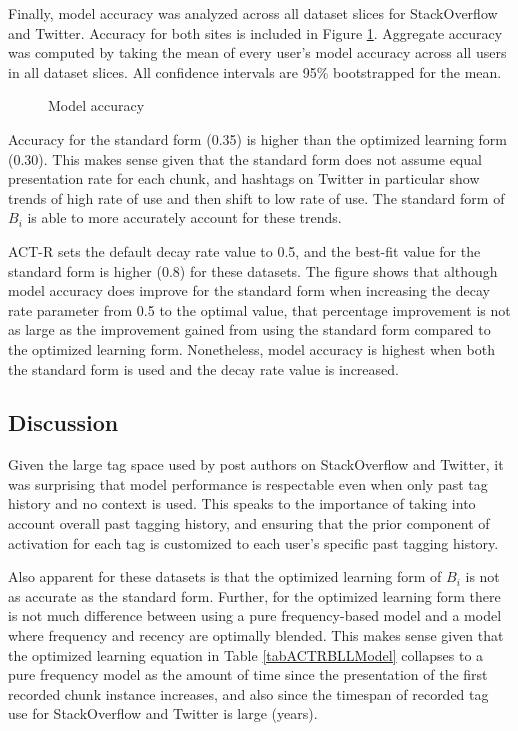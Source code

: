 \documentclass[man,floatsintext,donotrepeattitle]{apa6}
\begin{document}
Finally, model accuracy was analyzed across all dataset slices for StackOverflow and Twitter.
Accuracy for both sites is included in Figure \ref{figPriorAcc}. 
Aggregate accuracy was computed by taking the mean of every user's model accuracy across all users in all dataset slices.
All confidence intervals are 95\% bootstrapped for the mean. 

\begin{figure}[!htbp]
  \caption{Model accuracy}
  \label{figPriorAcc}
\end{figure}

Accuracy for the standard form (\num{0.35}) is higher than the optimized learning form (\num{0.30}).
This makes sense given that the standard form does not assume equal presentation rate for each chunk, and hashtags on Twitter in particular show trends of high rate of use and then shift to low rate of use. 
The standard form of $B_{i}$ is able to more accurately account for these trends.

ACT-R sets the default decay rate value to \num{0.5}, and the best-fit value for the standard form is higher (\num{0.8}) for these datasets.
The figure shows that although model accuracy does improve for the standard form when increasing the decay rate parameter from \num{0.5} to the optimal value,
that percentage improvement is not as large as the improvement gained from using the standard form compared to the optimized learning form.
Nonetheless, model accuracy is highest when both the standard form is used and the decay rate value is increased. 

\subsection{Discussion}

Given the large tag space used by post authors on StackOverflow and Twitter, it was surprising that model performance is respectable even when only past tag history and no context is used.
This speaks to the importance of taking into account overall past tagging history, and ensuring that the prior component of activation for each tag is customized to each user's specific past tagging history.

Also apparent for these datasets is that the optimized learning form of $B_{i}$ is not as accurate as the standard form.
Further, for the optimized learning form there is not much difference between using a pure frequency-based model and a model where frequency and recency are optimally blended.
This makes sense given that the optimized learning equation in Table \ref{tabACTRBLLModel} collapses to a pure frequency model as the amount of time since the presentation of the first recorded chunk instance increases,
and also since the timespan of recorded tag use for StackOverflow and Twitter is large (years).
\end{document}
